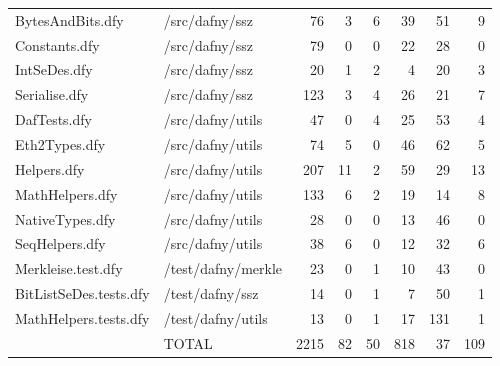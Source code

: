 \documentclass[a4paper, 12pt]{article}
\begin{document}
\begin{tabular}{llrrrrrr}
       BytesAndBits.dfy &                           /src/dafny/ssz &    76 &         3 &                6 &             39 &             51 &       9 \\
          Constants.dfy &                           /src/dafny/ssz &    79 &         0 &                0 &             22 &             28 &       0 \\
           IntSeDes.dfy &                           /src/dafny/ssz &    20 &         1 &                2 &              4 &             20 &       3 \\
          Serialise.dfy &                           /src/dafny/ssz &   123 &         3 &                4 &             26 &             21 &       7 \\
           DafTests.dfy &                         /src/dafny/utils &    47 &         0 &                4 &             25 &             53 &       4 \\
          Eth2Types.dfy &                         /src/dafny/utils &    74 &         5 &                0 &             46 &             62 &       5 \\
            Helpers.dfy &                         /src/dafny/utils &   207 &        11 &                2 &             59 &             29 &      13 \\
        MathHelpers.dfy &                         /src/dafny/utils &   133 &         6 &                2 &             19 &             14 &       8 \\
        NativeTypes.dfy &                         /src/dafny/utils &    28 &         0 &                0 &             13 &             46 &       0 \\
         SeqHelpers.dfy &                         /src/dafny/utils &    38 &         6 &                0 &             12 &             32 &       6 \\
     Merkleise.test.dfy &                       /test/dafny/merkle &    23 &         0 &                1 &             10 &             43 &       0 \\
 BitListSeDes.tests.dfy &                          /test/dafny/ssz &    14 &         0 &                1 &              7 &             50 &       1 \\
  MathHelpers.tests.dfy &                        /test/dafny/utils &    13 &         0 &                1 &             17 &            131 &       1 \\
                        &                                    TOTAL &  2215 &        82 &               50 &            818 &             37 &     109 \\
\bottomrule
\end{tabular}
\end{document}
